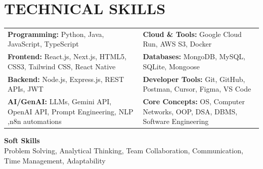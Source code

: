 \documentclass[10pt,a4paper]{article}
\begin{document}
\section*{TECHNICAL SKILLS}

\renewcommand{\arraystretch}{1.05}

\begin{tabularx}{\textwidth}{@{}X X@{}}

\textbf{Programming:} Python, Java, JavaScript, TypeScript &
\textbf{Cloud \& Tools:} Google Cloud Run, AWS S3, Docker \\

\textbf{Frontend:} React.js, Next.js, HTML5, CSS3, Tailwind CSS, React Native &
\textbf{Databases:} MongoDB, MySQL, SQLite, Mongoose \\

\textbf{Backend:} Node.js, Express.js, REST APIs, JWT &
\textbf{Developer Tools:} Git, GitHub, Postman, Cursor, Figma, VS Code \\

\textbf{AI/GenAI:} LLMs, Gemini API, OpenAI API, Prompt Engineering, NLP ,n8n automations&
\textbf{Core Concepts:} OS, Computer Networks, OOP, DSA, DBMS, Software Engineering\\

\end{tabularx}

\vspace{4pt}

\textbf{\large{Soft Skills}}\\[1pt]
\small Problem Solving, Analytical Thinking, Team Collaboration, Communication, Time Management, Adaptability



\end{document}

